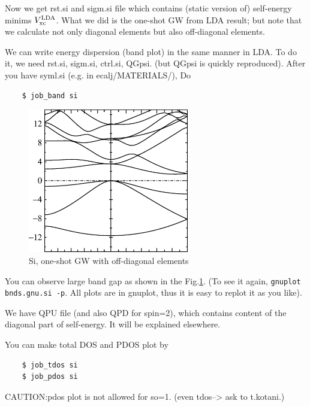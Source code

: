 \documentclass[a4paper,10pt,epsf,fleqn]{article}
\begin{document}
Now we get rst.si and sigm.si file which contains (static version of) self-energy
minims $V_{\rm xc}^{\rm LDA}$.
What we did is the one-shot GW from LDA result; but note that we
calculate not only diagonal elements but also off-diagonal elements. 

We can write energy dispersion (band plot) in the same manner in LDA.
To do it, we need rst.si, sigm.si, ctrl.si, QGpsi.
(but QGpsi is quickly reproduced). After you have syml.si
(e.g. in ecalj/MATERIALS/), Do
\begin{verbatim}
    $ job_band si
\end{verbatim}

\begin{figure}[h]
 \begin{center}
  \includegraphics[width=70mm]{img/bandoneshotsi.eps}
  \caption{Si, one-shot GW with off-diagonal elements}
 \end{center}
\label{sigwscone}
\end{figure}
You can observe large band gap as shown in the Fig.\ref{sigwscone}.
(To see it again, \verb+gnuplot bnds.gnu.si -p+.
All plots are in gnuplot, thus it is easy to replot it as you like).

We have QPU file (and also QPD for spin=2), which contains content
of the diagonal part of self-energy. It will be explained elsewhere.

You can make total DOS and PDOS plot by 
\begin{verbatim}
    $ job_tdos si
    $ job_pdos si
\end{verbatim}
CAUTION:pdos plot is not allowed for so=1. (even tdos--> ask to t.kotani.)\\
\end{document}
